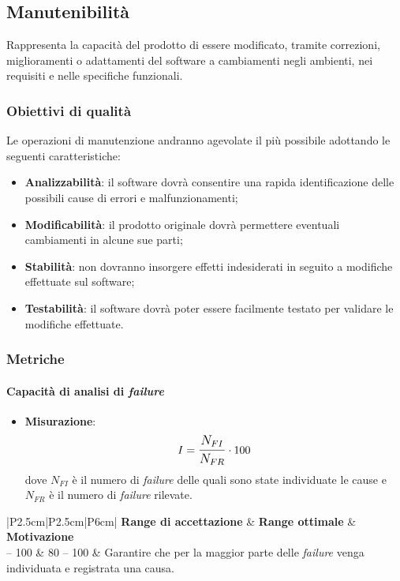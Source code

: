 \subsection{Manutenibilità}
Rappresenta la capacità del prodotto di essere modificato, tramite correzioni, miglioramenti o adattamenti del software a cambiamenti negli ambienti, nei requisiti e nelle specifiche funzionali.

\subsubsection{Obiettivi di qualità}
Le operazioni di manutenzione andranno agevolate il più possibile adottando le seguenti caratteristiche:
\begin{itemize}
\item \textbf{Analizzabilità}: il software dovrà consentire una rapida identificazione delle possibili cause di errori e malfunzionamenti;
\item \textbf{Modificabilità}: il prodotto originale dovrà permettere eventuali cambiamenti in alcune sue parti;
\item \textbf{Stabilità}: non dovranno insorgere effetti indesiderati in seguito a modifiche effettuate sul software;
\item \textbf{Testabilità}: il software dovrà poter essere facilmente testato per validare le modifiche effettuate.
\end{itemize}

\subsubsection{Metriche}
\paragraph{Capacità di analisi di \textit{failure}}

\begin{itemize}
	\item \textbf{Misurazione}: 
		$$I=\mathlarger{\frac{N_{FI}}{N_{FR}}} \cdot 100$$
	dove $N_{FI}$ è il numero di \textit{failure} delle quali sono state individuate le cause e $N_{FR}$ è il numero di \textit{failure} rilevate.
\end{itemize}

\begin{center}
		\begin{tabular}{|P{2.5cm}|P{2.5cm}|P{6cm}|}
		\hline
			\textbf{Range di accettazione}	& \textbf{Range ottimale} & \textbf{Motivazione} \\
			 -- 100 & 80 -- 100 &	Garantire che per la maggior parte delle \textit{failure} venga individuata e registrata una causa. \\
			\hline
			\end{tabular}
\end{center}

